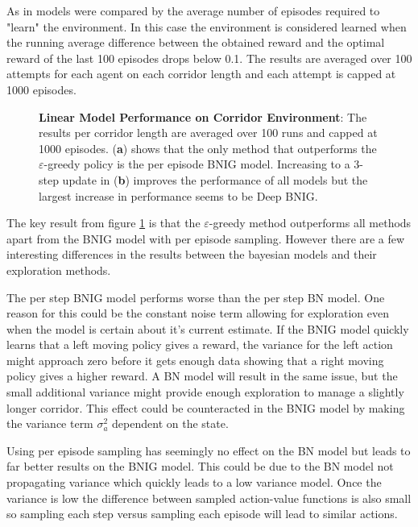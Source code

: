 As in \cite{osband_2018} models were compared by the average number of episodes required to "learn" the environment. In this case the environment is considered learned when the running average difference between the obtained reward and the optimal reward of the last 100 episodes drops below 0.1. The results are averaged over 100 attempts for each agent on each corridor length and each attempt is capped at 1000 episodes.

\begin{figure}[H]
    \centering
    \caption{\textbf{Linear Model Performance on Corridor Environment}: The results per corridor length are averaged over 100 runs and capped at 1000 episodes. (\textbf{a}) shows that the only method that outperforms the $\varepsilon$-greedy policy is the per episode BNIG model. Increasing to a 3-step update in (\textbf{b}) improves the performance of all models but the largest increase in performance seems to be Deep BNIG.}
    \label{fig:linear_corridor}
\end{figure}

The key result from figure \ref{fig:linear_corridor} is that the $\varepsilon$-greedy method outperforms all methods apart from the BNIG model with per episode sampling. However there are a few interesting differences in the results between the bayesian models and their exploration methods. 

The per step BNIG model performs worse than the per step BN model. One reason for this could be the constant noise term allowing for exploration even when the model is certain about it's current estimate. If the BNIG model quickly learns that a left moving policy gives a reward, the variance for the left action might approach zero before it gets enough data showing that a right moving policy gives a higher reward. A BN model will result in the same issue, but the small additional variance might provide enough exploration to manage a slightly longer corridor. This effect could be counteracted in the BNIG model by making the variance term $\sigma_a^2$ dependent on the state.

Using per episode sampling has seemingly no effect on the BN model but leads to far better results on the BNIG model. This could be due to the BN model not propagating variance which quickly leads to a low variance model. Once the variance is low the difference between sampled action-value functions is also small so sampling each step versus sampling each episode will lead to similar actions.

